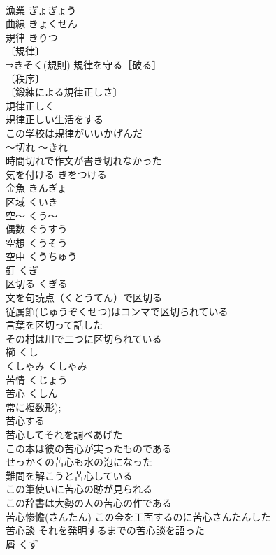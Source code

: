 \documentclass[8pt]{extreport}
\begin{document}
\begin{CJK}{UTF8}{min}
\\	漁業	ぎょぎょう	
\\	曲線	きょくせん	
\\	規律	きりつ	
\\	〔規律〕
\\	⇒きそく(規則) 規律を守る［破る］ 
\\	〔秩序〕
\\	〔鍛練による規律正しさ〕
\\	規律正しく 
\\	規律正しい生活をする 
\\	この学校は規律がいいかげんだ 
\\	～切れ	～きれ	
\\	時間切れで作文が書き切れなかった 
\\	気を付ける	きをつける	
\\	金魚	きんぎょ	
\\	区域	くいき	
\\	空～	くう～	
\\	偶数	ぐうすう	
\\	空想	くうそう	
\\	空中	くうちゅう	
\\	釘	くぎ	
\\	区切る	くぎる	
\\	文を句読点（くとうてん）で区切る 
\\	従属節(じゅうぞくせつ)はコンマで区切られている 
\\	言葉を区切って話した 
\\	その村は川で二つに区切られている 
\\	櫛	くし	
\\	くしゃみ	くしゃみ	
\\	苦情	くじょう	
\\	苦心	くしん	
\\	常に複数形); 
\\	苦心する 
\\	苦心してそれを調べあげた 
\\	この本は彼の苦心が実ったものである 
\\	せっかくの苦心も水の泡になった 
\\	難問を解こうと苦心している 
\\	この筆使いに苦心の跡が見られる 
\\	この辞書は大勢の人の苦心の作である 
\\	苦心惨憺(さんたん) この金を工面するのに苦心さんたんした 
\\	苦心談 それを発明するまでの苦心談を語った 
\\	屑	くず	

\end{CJK}
\end{document}
